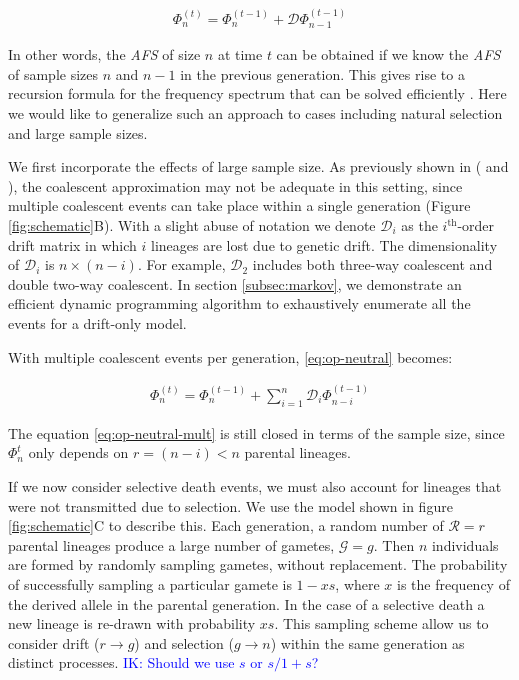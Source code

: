 \documentclass[review]{elsarticle}
\newcommand{\ra}{\rightarrow}
\newcommand{\ikcomment}[1]{\textcolor{blue}{IK: #1}}
\begin{document}
\begin{align}
  \label{eq:op-neutral}
  \Phi_{n}^{(t)}=\Phi_{n}^{(t-1)}+\mathcal{D} \Phi_{n-1}^{(t-1)}
\end{align}

In other words, the \textit{AFS} of size $n$ at time $t$ can be obtained if we know the \textit{AFS}
of sample sizes $n$ and $n-1$ in the previous generation. This gives rise to a recursion formula for
the frequency spectrum that can be solved efficiently \citep{JouganousEtAl2017}. Here we would like
to generalize such an approach to cases including natural selection and large sample sizes.

We first incorporate the effects of large sample size. As previously shown in
(\cite{BhaskarEtAl2014} and \cite{NelsonEtAl2019}), the coalescent approximation may not be adequate in this
setting, since multiple coalescent events can take place within a single generation
(Figure \ref{fig:schematic}B). With a slight abuse of notation we denote $\mathcal{D}_i$ as the
$i^{\text{th}}$-order drift matrix in which $i$ lineages are lost due to genetic drift. The
dimensionality of $\mathcal{D}_i$ is $n \times (n-i)$. For example, $\mathcal{D}_2$ includes both
three-way coalescent and double two-way coalescent. In section \ref{subsec:markov}, we demonstrate an
efficient dynamic programming algorithm to exhaustively enumerate all the events for a drift-only
model.

With multiple coalescent events per generation, \eqref{eq:op-neutral} becomes:

\begin{align}
  \label{eq:op-neutral-mult}
  \Phi_{n}^{(t)}=\Phi_{n}^{(t-1)}+\sum_{i=1}^{n}\mathcal{D}_i \Phi_{n-i}^{(t-1)}
\end{align}

The equation \eqref{eq:op-neutral-mult} is still closed in terms of the sample size, since
$\Phi_{n}^{t}$ only depends on $r=(n-i)<n$ parental lineages. 


If we now consider selective death events, we must also account for lineages that were not
transmitted due to selection. We use the model shown in figure \ref{fig:schematic}C to describe
this. Each generation, a random number of $\mathcal{R}=r$ parental lineages produce a large number
of gametes, $\mathcal{G}=g$. Then $n$ individuals are formed by randomly sampling gametes, without
replacement. The probability of successfully sampling a particular gamete is $1-xs$, where $x$ is
the frequency of the derived allele in the parental generation. In the case of a selective death a
new lineage is re-drawn with probability $xs$. This sampling scheme allow us to consider drift ($r
\ra g$) and selection ($g \ra n$) within the same generation as distinct processes.
\ikcomment{Should we use $s$ or $s/1+s$?}
 
\end{document}

